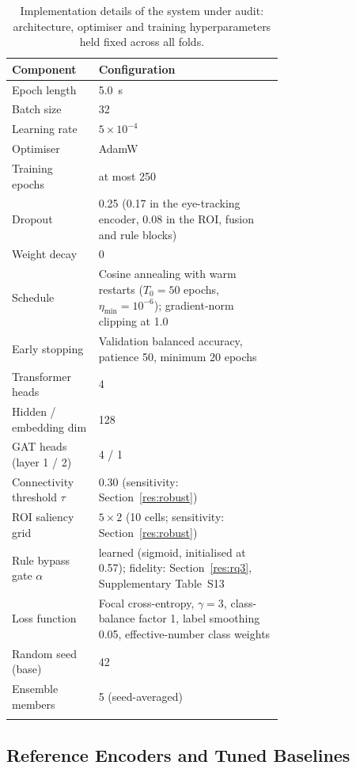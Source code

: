 \begin{table}[!htbp]
\caption{Implementation details of the system under audit: architecture, optimiser and training hyperparameters held fixed across all folds.}\label{tab2}
\small
\begin{tabular*}{\linewidth}{@{\extracolsep{\fill}}lp{0.68\linewidth}@{}}
\toprule
Component & Configuration \\
\midrule
Epoch length & 5.0~s \\
Batch size & 32 \\
Learning rate & $5\times10^{-4}$ \\
Optimiser & AdamW \\
Training epochs & at most 250 \\
Dropout & 0.25 (0.17 in the eye-tracking encoder, 0.08 in the ROI, fusion and rule blocks) \\
Weight decay & 0 \\
Schedule & Cosine annealing with warm restarts ($T_0=50$ epochs, $\eta_{\min}=10^{-6}$); gradient-norm clipping at 1.0 \\
Early stopping & Validation balanced accuracy, patience 50, minimum 20 epochs \\
Transformer heads & 4 \\
Hidden / embedding dim & 128 \\
GAT heads (layer 1 / 2) & 4 / 1 \\
Connectivity threshold $\tau$ & 0.30 (sensitivity: Section~\ref{res:robust}) \\
ROI saliency grid & $5\times2$ (10 cells; sensitivity: Section~\ref{res:robust}) \\
Rule bypass gate $\alpha$ & learned (sigmoid, initialised at 0.57); fidelity: Section~\ref{res:rq3}, Supplementary Table~S13 \\
Loss function & Focal cross-entropy, $\gamma=3$, class-balance factor 1, label smoothing 0.05, effective-number class weights \cite{ref49} \\
Random seed (base) & 42 \\
Ensemble members & 5 (seed-averaged) \\
\botrule
\end{tabular*}
\end{table}

\subsection{Reference Encoders and Tuned Baselines}\label{sec:references}


